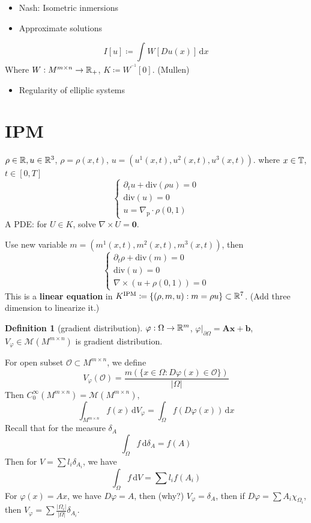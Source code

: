 \documentclass{amsart}
\let\originalmathbb\mathbb
\renewcommand{\mathbb}[1]{%
    \ifstrequal{#1}{1}{\mathbbm{#1}}{\originalmathbb{#1}}%
}
\theoremstyle{plain}
\theoremstyle{definition}
\newtheorem{definition}[theorem]{Definition}
\theoremstyle{remark}
\begin{document}
\begin{itemize}
	\item Nash: Isometric inmersions
	\item Approximate solutions
\end{itemize}
\[
I[u]\coloneqq \int_{}^{}W[Du(x)]  \, \mathrm{d}x 
\]
Where $W:M^{m\times n}\to \mathbb{R}_{+}$, $K\coloneqq W^{^{-1}}[0]$. (Mullen)

\begin{itemize}
	\item Regularity of elliplic systems
\end{itemize}


\section{IPM}

$\rho\in \mathbb{R}, u\in \mathbb{R}^{3}$, $\rho=\rho(x,t)$, $u=(u^{1}(x,t),u^{2}(x,t),u^{3}(x,t))$. where $x\in \mathbb{T}$, $t\in[0,T]$
\[
\begin{cases}
\partial _{t}u+\mathrm{div}(\rho u)=0 \\
\mathrm{div}(u)=0 \\
u=\nabla_{\text{p}}\cdot \rho(0,1)
\end{cases}
\]
A PDE: for $U\in K$, solve $\nabla \times U= \mathbf{0}$.

Use new variable $m=(m^{1}(x,t),m^{2}(x,t),m^{3}(x,t))$, then
\[
\begin{cases}
\partial _{t}\rho +\mathrm{div}(m)=0 \\
\mathrm{div}(u)=0 \\
\nabla \times(u+\rho(0,1))=0
\end{cases}
\]
This is a \textbf{linear equation} in $K^{\text{IPM}}\coloneqq \{ (\rho,m,u):m=\rho u \}\subset \mathbb{R}^{7}$. (Add three dimension to linearize it.)

\begin{definition}[gradient distribution]
$\varphi:\Omega\to \mathbb{R}^{m}$, $\left.\varphi\right|_{\partial \Omega}=\mathbf{A}\mathbf{x}+\mathbf{b}$, $V_{\varphi}\in \mathcal{M}(M^{m\times n})$ is gradient distribution.
\end{definition}
For open subset $\mathcal{O}\subset M^{m\times n}$, we define
\[
V_{\varphi}(\mathcal{O})=\frac{m(\{ x\in \Omega:D\varphi(x)\in \mathcal{O} \})}{\lvert \Omega \rvert }
\]
Then $C^{\infty}_{0}(M^{m\times n})=\mathcal{M}(M^{m\times n})$,
\[
\int_{M^{m\times n}}^{} f(x) \, \mathrm{d}V_{\varphi}=\int_{\Omega}^{} f(D\varphi(x)) \, \mathrm{d}x 
\]
Recall that for the measure $\delta_{A}$
\[
\int_{\Omega}^{} f \, \mathrm{d}\delta_{A} =f(A)
\]
Then for $V=\sum l_i\delta_{A_i}$, we have
\[
\int_{\Omega}^{} f \, \mathrm{d}V=\sum l_if(A_i)
\]
For $\varphi(x)=Ax$, we have $D\varphi=A$, then (why?) $V_{\varphi}=\delta_{A}$, then if $D\varphi=\sum A_i\chi_{\Omega _i}$, then $V_{\varphi}=\sum\frac{\lvert \Omega _i \rvert}{\lvert \Omega \rvert}\delta_{A_i}$.
\end{document}
